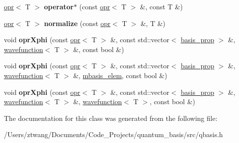\begin{DoxyCompactItemize}
\hyperlink{classqbasis_1_1opr}{opr}$<$ T $>$ {\bfseries operator$\ast$} (const \hyperlink{classqbasis_1_1opr}{opr}$<$ T $>$ \&, const T \&)
\item 
\mbox{\label{classqbasis_1_1opr_a5683526d3057a75220d1207c8db1b867}} 
\hyperlink{classqbasis_1_1opr}{opr}$<$ T $>$ {\bfseries normalize} (const \hyperlink{classqbasis_1_1opr}{opr}$<$ T $>$ \&, T \&)
\item 
\mbox{\label{classqbasis_1_1opr_a938733638028a298418622998077db12}} 
void {\bfseries opr\+Xphi} (const \hyperlink{classqbasis_1_1opr}{opr}$<$ T $>$ \&, const std\+::vector$<$ \hyperlink{classqbasis_1_1basis__prop}{basis\+\_\+prop} $>$ \&, \hyperlink{classqbasis_1_1wavefunction}{wavefunction}$<$ T $>$ \&, const bool \&)
\item 
\mbox{\label{classqbasis_1_1opr_ac881f7f2c19ae767ca695ec696526f3b}} 
void {\bfseries opr\+Xphi} (const \hyperlink{classqbasis_1_1opr}{opr}$<$ T $>$ \&, const std\+::vector$<$ \hyperlink{classqbasis_1_1basis__prop}{basis\+\_\+prop} $>$ \&, \hyperlink{classqbasis_1_1wavefunction}{wavefunction}$<$ T $>$ \&, \hyperlink{classqbasis_1_1mbasis__elem}{mbasis\+\_\+elem}, const bool \&)
\item 
\mbox{\label{classqbasis_1_1opr_a453118abdd7bb3e60a43d8bf6b871562}} 
void {\bfseries opr\+Xphi} (const \hyperlink{classqbasis_1_1opr}{opr}$<$ T $>$ \&, const std\+::vector$<$ \hyperlink{classqbasis_1_1basis__prop}{basis\+\_\+prop} $>$ \&, \hyperlink{classqbasis_1_1wavefunction}{wavefunction}$<$ T $>$ \&, \hyperlink{classqbasis_1_1wavefunction}{wavefunction}$<$ T $>$, const bool \&)
\end{DoxyCompactItemize}


The documentation for this class was generated from the following file\+:\begin{DoxyCompactItemize}
\item 
/\+Users/ztwang/\+Documents/\+Code\+\_\+\+Projects/quantum\+\_\+basis/src/qbasis.\+h\end{DoxyCompactItemize}
